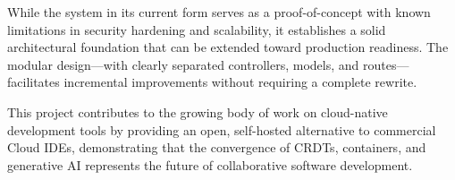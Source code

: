 \documentclass[12pt,a4paper,oneside]{report}
\begin{document}
While the system in its current form serves as a proof-of-concept with known limitations in security hardening and scalability, it establishes a solid architectural foundation that can be extended toward production readiness. The modular design---with clearly separated controllers, models, and routes---facilitates incremental improvements without requiring a complete rewrite.

This project contributes to the growing body of work on cloud-native development tools by providing an open, self-hosted alternative to commercial Cloud IDEs, demonstrating that the convergence of CRDTs, containers, and generative AI represents the future of collaborative software development.


\end{document}
